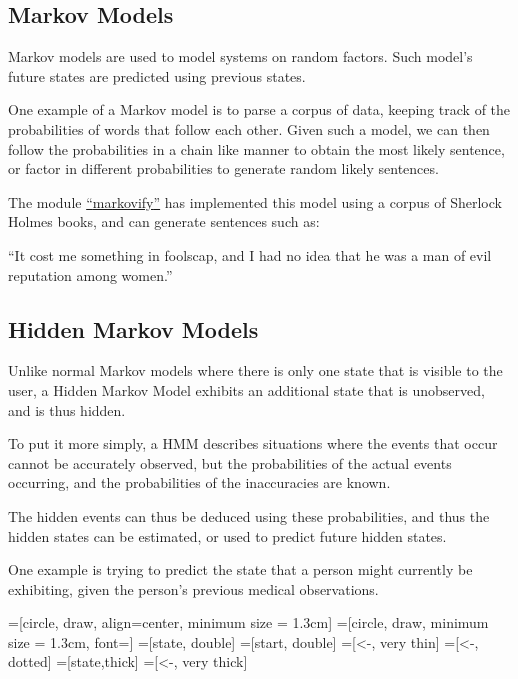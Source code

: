 \documentclass{article}
\begin{document}
\subsection{Markov Models}
Markov models are used to model systems on random factors. Such model's future
states are predicted using previous states.

One example of a Markov model is to parse a corpus of data, keeping track of
the probabilities of words that follow each other. Given such a model, we can
then follow the probabilities in a chain like manner to obtain the most likely
sentence, or factor in different probabilities to generate random likely
sentences.

The module \href{https://github.com/jsvine/markovify}{``\underline{markovify}''} has implemented this model using a corpus of Sherlock
Holmes books, and can generate sentences such as:
\begin{displayquote}
    ``It cost me something in foolscap, and I had no idea that
    he was a man of evil reputation among women.''
\end{displayquote}

\subsection{Hidden Markov Models}
Unlike normal Markov models where there is only one state that is visible to
the user, a Hidden Markov Model exhibits an additional state that is
unobserved, and is thus hidden.

To put it more simply, a HMM describes situations where the events that occur
cannot be accurately observed, but the probabilities of the actual events
occurring, and the probabilities of the inaccuracies are known.

The hidden events can thus be deduced using these probabilities, and thus the
hidden states can be estimated, or used to predict future hidden states.

One example is trying to predict the state that a person might currently be
exhibiting, given the person's previous medical observations.

=[circle, draw, align=center, minimum size = 1.3cm]%
=[circle, draw, minimum size = 1.3cm, font=\footnotesize]
=[state, double]
=[start, double]
=[<-, very thin]
=[<-, dotted]
=[state,thick]
=[<-, very thick]
\end{document}
